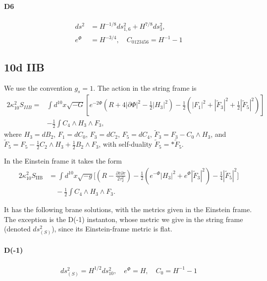\paragraph{D6}
\begin{equation}
\begin{aligned}
ds^2 
&= H^{-1/8}ds_{1,6}^2 + H^{7/8}ds_3^2,\\
e^{\Phi}
&= H^{-3/4},\quad
C_{0123456} = H^{-1}-1
\end{aligned}
\end{equation}

\subsection*{10d IIB}

We use the convention $g_s = 1$.
The action in the string frame is
\begin{equation}
\begin{aligned}
2\kappa_{10}^2 S_{IIB} =
&\int d^{10}x\sqrt{-G}\left[
    e^{-2\Phi}\left(R+4|\partial\Phi|^2-\frac{1}{2}|H_3|^2\right)
    -\frac{1}{2}\left(|F_1|^2+|\tilde{F}_3|^2+\frac{1}{2}|\tilde{F}_5|^2\right)
\right]\\
&- \frac{1}{2}\int C_4\wedge H_3\wedge F_3,
\end{aligned}
\end{equation}
where $H_3 = dB_2$, $F_1 = dC_0$, $F_3 = dC_2$, $F_5 = dC_4$, $\tilde{F}_3 = F_3 - C_0 \wedge H_3$, and $\tilde{F}_5 = F_5 - \frac{1}{2}C_2 \wedge H_3 + \frac{1}{2}B_2 \wedge F_3$, with self-duality $\tilde{F}_5 = *\tilde{F}_5$.

In the Einstein frame it takes the form
\begin{equation}
\begin{aligned}
2\kappa_{10}^2S_{\mathrm{IIB}}
&=\int d^{10}x\sqrt{-g}
\Bigg[\left(R-\frac{\partial\bar\tau\partial\tau}{2\tau_2^2}\right)-\frac{1}{2}\left(e^{-\Phi}|H_3|^2+e^{\Phi}|\tilde F_3|^2\right)-\frac{1}{4}|\tilde F_5|^2\Bigg]\\
&\quad-\frac{1}{2}\int C_4\wedge H_3\wedge F_3.
\label{einstein frame}
\end{aligned}
\end{equation}

It has the following brane solutions, with the metrics given in the Einstein frame. The exception is the D(-1) instanton, whose metric we give in the string frame (denoted $ds_{(S)}^2$), since its Einstein-frame metric is flat.

\paragraph{D(-1)}
\begin{equation}
\begin{aligned}
ds_{(S)}^2 = H^{1/2}ds_{10}^2,\quad
e^{\Phi} = H,\quad
C_0 = H^{-1}-1
\end{aligned}
\end{equation}

